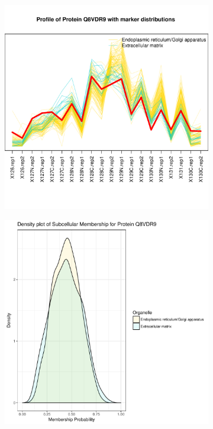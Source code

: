 \documentclass[12pt,english]{article}\usepackage[]{graphicx}\usepackage[]{color}
\makeatletter
\def\maxwidth{ %
  \ifdim\Gin@nat@width>\linewidth
    \linewidth
  \else
    \Gin@nat@width
  \fi
}
\newenvironment{knitrout}{}{} %
\makeatother
\begin{document}
\begin{figure}[h]
\begin{subfigure}[t]{0.5\textwidth}
\begin{knitrout}
{\centering \includegraphics[width=\maxwidth]{figure/unnamed-chunk-21-1} 

}



\end{knitrout}
    \caption{}
  \end{subfigure}
  \vspace{1cm}
  \begin{subfigure}[t]{0.5\textwidth}
    \centering
\begin{knitrout}
\color{fgcolor}

{\centering \includegraphics[width=\maxwidth]{figure/unnamed-chunk-22-1} 

}
\end{knitrout}
\end{subfigure}
\end{figure}
\end{document}
